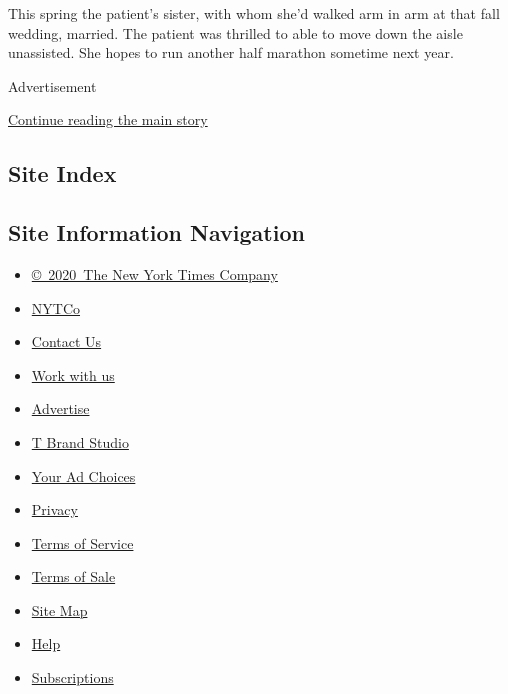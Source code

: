 This spring the patient's sister, with whom she'd walked arm in arm at
that fall wedding, married. The patient was thrilled to able to move
down the aisle unassisted. She hopes to run another half marathon
sometime next year.

Advertisement

\protect\hyperlink{after-bottom}{Continue reading the main story}

\hypertarget{site-index}{%
\subsection{Site Index}\label{site-index}}

\hypertarget{site-information-navigation}{%
\subsection{Site Information
Navigation}\label{site-information-navigation}}

\begin{itemize}
\tightlist
\item
  \href{https://help.nytimes3xbfgragh.onion/hc/en-us/articles/115014792127-Copyright-notice}{©~2020~The
  New York Times Company}
\end{itemize}

\begin{itemize}
\tightlist
\item
  \href{https://www.nytco.com/}{NYTCo}
\item
  \href{https://help.nytimes3xbfgragh.onion/hc/en-us/articles/115015385887-Contact-Us}{Contact
  Us}
\item
  \href{https://www.nytco.com/careers/}{Work with us}
\item
  \href{https://nytmediakit.com/}{Advertise}
\item
  \href{http://www.tbrandstudio.com/}{T Brand Studio}
\item
  \href{https://www.nytimes3xbfgragh.onion/privacy/cookie-policy\#how-do-i-manage-trackers}{Your
  Ad Choices}
\item
  \href{https://www.nytimes3xbfgragh.onion/privacy}{Privacy}
\item
  \href{https://help.nytimes3xbfgragh.onion/hc/en-us/articles/115014893428-Terms-of-service}{Terms
  of Service}
\item
  \href{https://help.nytimes3xbfgragh.onion/hc/en-us/articles/115014893968-Terms-of-sale}{Terms
  of Sale}
\item
  \href{https://spiderbites.nytimes3xbfgragh.onion}{Site Map}
\item
  \href{https://help.nytimes3xbfgragh.onion/hc/en-us}{Help}
\item
  \href{https://www.nytimes3xbfgragh.onion/subscription?campaignId=37WXW}{Subscriptions}
\end{itemize}
